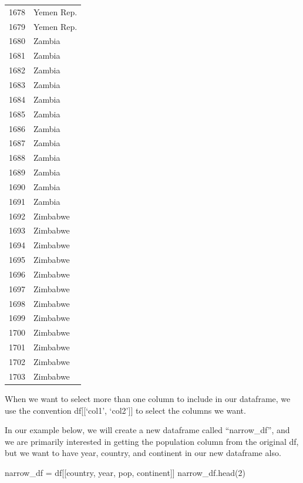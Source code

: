 \documentclass[
  letterpaper,
  DIV=11,
  numbers=noendperiod]{scrreprt}
\newenvironment{Shaded}{\begin{snugshade}}{\end{snugshade}}
\newcommand{\DecValTok}[1]{\textcolor[rgb]{0.68,0.00,0.00}{#1}}
\newcommand{\NormalTok}[1]{\textcolor[rgb]{0.00,0.23,0.31}{#1}}
\newcommand{\OperatorTok}[1]{\textcolor[rgb]{0.37,0.37,0.37}{#1}}
\newcommand{\StringTok}[1]{\textcolor[rgb]{0.13,0.47,0.30}{#1}}
\begin{document}
\begin{tabular}{ll}
1678 &                Yemen Rep. \\
1679 &                Yemen Rep. \\
1680 &                    Zambia \\
1681 &                    Zambia \\
1682 &                    Zambia \\
1683 &                    Zambia \\
1684 &                    Zambia \\
1685 &                    Zambia \\
1686 &                    Zambia \\
1687 &                    Zambia \\
1688 &                    Zambia \\
1689 &                    Zambia \\
1690 &                    Zambia \\
1691 &                    Zambia \\
1692 &                  Zimbabwe \\
1693 &                  Zimbabwe \\
1694 &                  Zimbabwe \\
1695 &                  Zimbabwe \\
1696 &                  Zimbabwe \\
1697 &                  Zimbabwe \\
1698 &                  Zimbabwe \\
1699 &                  Zimbabwe \\
1700 &                  Zimbabwe \\
1701 &                  Zimbabwe \\
1702 &                  Zimbabwe \\
1703 &                  Zimbabwe \\
\bottomrule
\end{tabular}

When we want to select more than one column to include in our dataframe,
we use the convention df{[}{[}`col1', `col2'{]}{]} to select the columns
we want.

In our example below, we will create a new dataframe called
``narrow\_df'', and we are primarily interested in getting the
population column from the original df, but we want to have year,
country, and continent in our new dataframe also.

\begin{Shaded}
\begin{Highlighting}[]
\NormalTok{narrow\_df }\OperatorTok{=}\NormalTok{ df[[}\StringTok{\textquotesingle{}country\textquotesingle{}}\NormalTok{, }\StringTok{\textquotesingle{}year\textquotesingle{}}\NormalTok{, }\StringTok{\textquotesingle{}pop\textquotesingle{}}\NormalTok{, }\StringTok{\textquotesingle{}continent\textquotesingle{}}\NormalTok{]]}
\NormalTok{narrow\_df.head(}\DecValTok{2}\NormalTok{)}
\end{Highlighting}
\end{Shaded}
\end{document}
